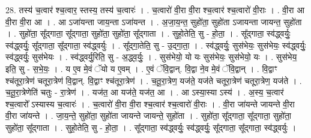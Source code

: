 \documentclass[17pt]{extarticle}
\begin{document}
28. तस्य॑ च॒त्वार॑ श्च॒त्वार॒ स्तस्य॒ तस्य॑ च॒त्वारः॑ । . च॒त्वारो॑ वी॒रा वी॒रा श्च॒त्वार॑ श्च॒त्वारो॑ वी॒राः । . वी॒रा आ वी॒रा वी॒रा आ । . आ ऽजा॑यन्ता जाय॒न्ता ऽजा॑यन्त । . अ॒जा॒य॒न्त॒ सुहो॑ता॒ सुहो॑ता ऽजायन्ता जायन्त॒ सुहो॑ता । . सुहो॑ता॒ सू᳚द्‍गाता॒ सू᳚द्‍गाता॒ सुहो॑ता॒ सुहो॑ता॒ सू᳚द्‍गाता । . सुहो॒तेति॒ सु - हो॒ता॒ । . सू᳚द्‍गाता॒ स्व॑द्ध्वर्युः॒ स्व॑द्ध्वर्युः॒ सू᳚द्‍गाता॒ सू᳚द्‍गाता॒ स्व॑द्ध्वर्युः । . सू᳚द्‍गा॒तेति॒ सु - उ॒द्‍गा॒ता॒ । . स्व॑द्ध्वर्युः॒ सुस॑भेयः॒ सुस॑भेयः॒ स्व॑द्ध्वर्युः॒ स्व॑द्ध्वर्युः॒ सुस॑भेयः । . स्व॑द्ध्वर्यु॒रिति॒ सु - अ॒द्ध्व॒र्युः॒ । . सुस॑भेयो॒ यो यः सुस॑भेयः॒ सुस॑भेयो॒ यः । . सुस॑भेय॒ इति॒ सु - स॒भे॒यः॒ । . य ए॒व मे॒वं ॅयो य ए॒वम् । . ए॒वं ॅवि॒द्वान्. वि॒द्वा ने॒व मे॒वं ॅवि॒द्वान् । . वि॒द्वाꣳ श्च॑तूरा॒त्रेण॑ चतूरा॒त्रेण॑ वि॒द्वान्. वि॒द्वाꣳ श्च॑तूरा॒त्रेण॑ । . च॒तू॒रा॒त्रेण॒ यज॑ते॒ यज॑ते चतूरा॒त्रेण॑ चतूरा॒त्रेण॒ यज॑ते । . च॒तू॒रा॒त्रेणेति॑ चतुः - रा॒त्रेण॑ । . यज॑त॒ आ यज॑ते॒ यज॑त॒ आ । . आ ऽस्या॒स्या ऽस्य॑ । . अ॒स्य॒ च॒त्वार॑ श्च॒त्वारो᳚ ऽस्यास्य च॒त्वारः॑ । . च॒त्वारो॑ वी॒रा वी॒रा श्च॒त्वार॑ श्च॒त्वारो॑ वी॒राः । . वी॒रा जा॑यन्ते जायन्ते वी॒रा वी॒रा जा॑यन्ते । . जा॒य॒न्ते॒ सुहो॑ता॒ सुहो॑ता जायन्ते जायन्ते॒ सुहो॑ता । . सुहो॑ता॒ सू᳚द्‍गाता॒ सू᳚द्‍गाता॒ सुहो॑ता॒ सुहो॑ता॒ सू᳚द्‍गाता । . सुहो॒तेति॒ सु - हो॒ता॒ । . सू᳚द्‍गाता॒ स्व॑द्ध्वर्युः॒ स्व॑द्ध्वर्युः॒ सू᳚द्‍गाता॒ सू᳚द्‍गाता॒ स्व॑द्ध्वर्युः । \newline
\end{document}
